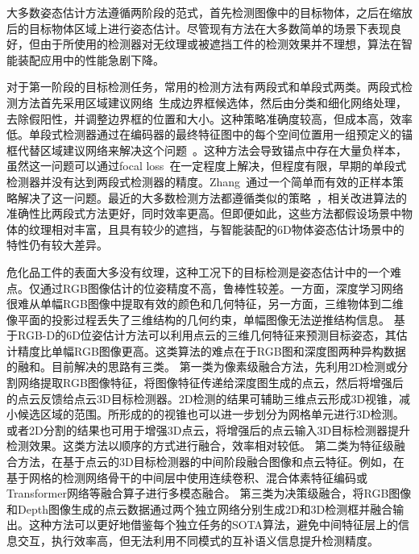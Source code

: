 \documentclass[12pt]{article}
\begin{document}
大多数姿态估计方法遵循两阶段的范式，首先检测图像中的目标物体，之后在缩放后的目标物体区域上进行姿态估计。尽管现有方法在大多数简单的场景下表现良好，但由于所使用的检测器对无纹理或被遮挡工件的检测效果并不理想，算法在智能装配应用中的性能急剧下降。

对于第一阶段的目标检测任务，常用的检测方法有两段式和单段式两类\cite{ATSS, fcosv1, fcosv2, PAA, faster-rcnn, maskrcnn}。两段式检测方法首先采用区域建议网络~\cite{faster-rcnn, maskrcnn}生成边界框候选体，然后由分类和细化网络处理，去除假阳性，并调整边界框的位置和大小。这种策略准确度较高，但成本高，效率低。单段式检测器通过在编码器的最终特征图中的每个空间位置用一组预定义的锚框代替区域建议网络来解决这个问题~\cite{retinanet,fcosv1,yolov1}。这种方法会导致锚点中存在大量负样本，虽然这一问题可以通过focal loss~\cite{retinanet,fpn}在一定程度上解决，但程度有限，早期的单段式检测器并没有达到两段式检测器的精度。Zhang~\cite{ATSS}通过一个简单而有效的正样本策略解决了这一问题。最近的大多数检测方法都遵循类似的策略~\cite{fcosv2, PAA, autoassign, OTA, TTF, yolov3}，相关改进算法的准确性比两段式方法更好，同时效率更高。但即便如此，这些方法都假设场景中物体的纹理相对丰富，且具有较少的遮挡，与智能装配的6D物体姿态估计场景中的特性仍有较大差异。

危化品工件的表面大多没有纹理，这种工况下的目标检测是姿态估计中的一个难点。仅通过RGB图像估计的位姿精度不高，鲁棒性较差。一方面，深度学习网络很难从单幅RGB图像中提取有效的颜色和几何特征，另一方面，三维物体到二维像平面的投影过程丢失了三维结构的几何约束，单幅图像无法逆推结构信息。
基于RGB-D的6D位姿估计方法可以利用点云的三维几何特征来预测目标姿态，其估计精度比单幅RGB图像更高。这类算法的难点在于RGB图和深度图两种异构数据的融和。目前解决的思路有三类。
第一类为像素级融合方法，先利用2D检测或分割网络提取RGB图像特征，将图像特征传递给深度图生成的点云，然后将增强后的点云反馈给点云3D目标检测器。2D检测的结果可辅助三维点云形成3D视锥\cite{Qi2018}，减小候选区域的范围。所形成的的视锥也可以进一步划分为网格单元\cite{Wang2019}进行3D检测。或者2D分割的结果也可用于增强3D点云\cite{Vora2020}，将增强后的点云输入3D目标检测器提升检测效果。这类方法以顺序的方式进行融合，效率相对较低。
第二类为特征级融合方法，在基于点云的3D目标检测器的中间阶段融合图像和点云特征。例如，在基于网格的检测网络骨干的中间层中使用连续卷积\cite{Liang2018, Liang2019}、混合体素特征编码\cite{Sindagi2019}或Transformer\cite{Zhang2022}网络等融合算子进行多模态融合。
第三类为决策级融合，将RGB图像和Depth图像生成的点云数据通过两个独立网络分别生成2D和3D检测框\cite{Asvadi2018}并融合输出。这种方法可以更好地借鉴每个独立任务的SOTA算法，避免中间特征层上的信息交互，执行效率高，但无法利用不同模式的互补语义信息\cite{Pang2020}提升检测精度。
\end{document}
